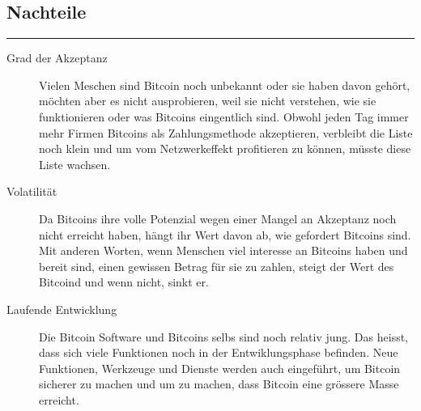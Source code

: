 \subsection*{Nachteile}
\vspace{-10mm}
\noindent\rule{0.8\textwidth}{0.4pt}
\begin{description}
  \item[Grad der Akzeptanz] Vielen Meschen sind Bitcoin noch unbekannt oder sie haben davon
  gehört, möchten aber es nicht ausprobieren, weil sie nicht verstehen, wie sie funktionieren
  oder was Bitcoins eingentlich sind. Obwohl jeden Tag immer mehr Firmen Bitcoins als Zahlungsmethode
  akzeptieren, verbleibt die Liste noch klein und um vom Netzwerkeffekt profitieren zu können, müsste
  diese Liste wachsen.
  \item[Volatilität] Da Bitcoins ihre volle Potenzial wegen einer Mangel an Akzeptanz noch nicht
  erreicht haben, hängt ihr Wert davon ab, wie gefordert Bitcoins sind. Mit anderen Worten, wenn Menschen
  viel interesse an Bitcoins haben und bereit sind, einen gewissen Betrag für sie zu zahlen, steigt der
  Wert des Bitcoind und wenn nicht, sinkt er.
  \item[Laufende Entwicklung] Die Bitcoin Software und Bitcoins selbs sind noch relativ jung. Das heisst,
  dass sich viele Funktionen noch in der Entwiklungsphase befinden. Neue Funktionen, Werkzeuge und Dienste
  werden auch eingeführt, um Bitcoin sicherer zu machen und um zu machen, dass Bitcoin eine grössere Masse
  erreicht.

\end{description}
